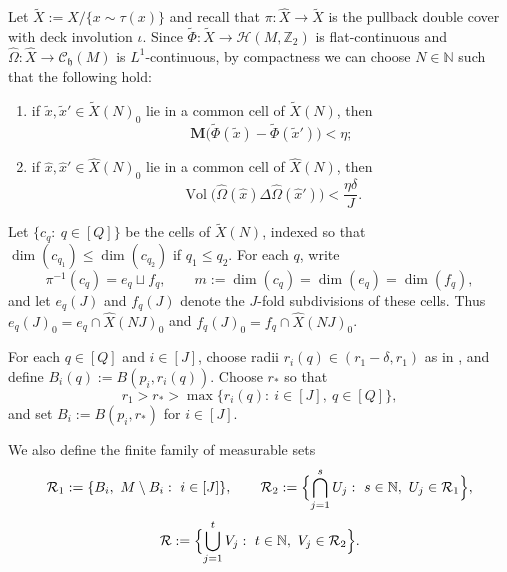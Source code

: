 \documentclass[12pt,english]{article}
\theoremstyle{definition}
\begin{document}
Let $\tilde X:=X/\{x\sim \tau(x)\}$ and recall that $\pi:\widehat X\to \tilde X$ is the pullback double cover with deck involution $\iota$. Since $\tilde\Phi:\tilde X\to \mathcal H(M,\mathbb{Z}_2)$ is flat-continuous and $\widehat\Omega:\widehat X\to \mathcal{C}_{\mathfrak h}(M)$ is $L^1$-continuous, by compactness we can choose
$N\in\mathbb{N}$ such that the following hold:
\begin{enumerate}
\item[(i)] if $\tilde x,\tilde x'\in \tilde X(N)_0$ lie in a common cell of $\tilde X(N)$, then
\[
\mathbf M\bigl(\tilde\Phi(\tilde x)-\tilde\Phi(\tilde x')\bigr)<\eta;
\]
\item[(ii)] if $\hat x,\hat x'\in \widehat X(N)_0$ lie in a common cell of $\widehat X(N)$, then
\[
\operatorname{Vol}\bigl(\widehat\Omega(\hat x)\Delta \widehat\Omega(\hat x')\bigr)<\frac{\eta\delta}{J}.
\]
\end{enumerate}

Let $\{c_q:\ q\in[Q]\}$ be the cells of $\tilde X(N)$, indexed so that $\dim(c_{q_1})\le \dim(c_{q_2})$ if $q_1\le q_2$.
For each $q$, write
\[
\pi^{-1}(c_q)=e_q\sqcup f_q,
\qquad
m:=\dim(c_q)=\dim(e_q)=\dim(f_q),
\]
and let $e_q(J)$ and $f_q(J)$ denote the $J$-fold subdivisions of these cells. Thus $e_q(J)_0=e_q\cap \widehat X(NJ)_0$ and $f_q(J)_0=f_q\cap \widehat X(NJ)_0$.

For each $q\in[Q]$ and $i\in[J]$, choose radii $r_i(q)\in(r_1-\delta,r_1)$ as in \cite[(3.14)]{Dey}, and define $B_i(q):=B(p_i,r_i(q))$. Choose $r_\ast$ so that
\[
r_1>r_\ast>\max\{r_i(q):\ i\in[J],\ q\in[Q]\},
\]
and set $B_i:=B(p_i,r_\ast)$ for $i\in[J]$.

We also define the finite family of measurable sets
\[
\mathcal R_1:=\{B_i,\ M\setminus B_i:\ i\in[J]\},
\qquad
\mathcal R_2:=\Bigl\{\bigcap_{j=1}^s U_j:\ s\in\mathbb{N},\ U_j\in\mathcal R_1\Bigr\},
\]
\[
\mathcal R:=\Bigl\{\bigcup_{j=1}^t V_j:\ t\in\mathbb{N},\ V_j\in\mathcal R_2\Bigr\}.
\]
\end{document}
